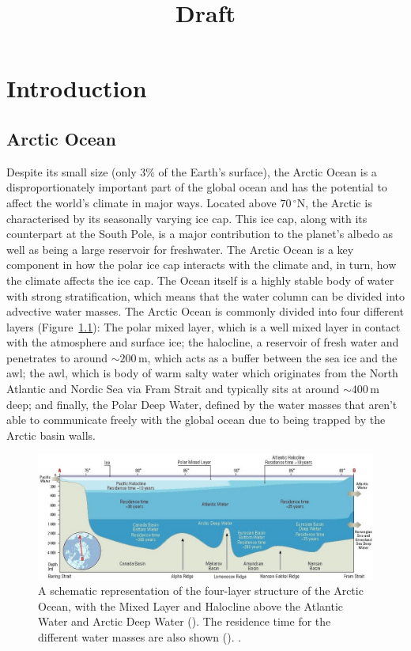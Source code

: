 \documentclass[12pt,a4paper]{report}
\title{Draft}
\newcommand*\figref[1]{Figure~\ref{#1}}
\begin{document}
\maketitle


\chapter{Introduction}
\label{intro}

\glsresetall

\section{Arctic Ocean}
\label{arcticocean}


Despite its small size (only $3\%$ of the Earth's surface), the Arctic
Ocean is a disproportionately important part of the global ocean and has the potential
to affect the world's climate in major ways. Located above
$70\,^{\circ}\mathrm{N}$, the Arctic is characterised by its seasonally
varying ice cap. This ice cap, along with its counterpart at the South
Pole, is a major contribution to the planet's albedo as well as being
a large reservoir for freshwater. The Arctic Ocean is a key component
in how the polar ice cap interacts with the climate and, in turn, how
the climate affects the ice cap. 
The Ocean itself is a highly stable body of water with strong stratification, 
which means that the water column can be divided into advective water masses.
The Arctic Ocean is commonly divided into four different layers (\figref{fig:amap}):
The polar mixed layer, which is a well mixed layer in
contact with the atmosphere and surface ice; the halocline, a
reservoir of fresh water and penetrates to around ${\sim}200\,\mathrm{m}$, which acts
as a buffer between the sea ice and the \gls{awl}; the \gls{awl},
which is body of warm salty water which originates from the North Atlantic and Nordic 
Sea via Fram Strait and typically sits at around ${\sim}400\,\mathrm{m}$ deep; and finally, 
the Polar Deep Water, defined by the water masses that aren't
able to communicate freely with the global ocean due to being trapped by the Arctic basin walls.



\begin{figure}
	\centering
	\includegraphics[width=\linewidth]{amap}
	\caption[\cite{wilson1998amap}]{  A schematic representation of the four-layer structure of the Arctic Ocean, with the Mixed Layer and Halocline
		above the Atlantic Water and Arctic Deep Water (\cite{aagaard1989role}). 
		The residence time for the different water masses are also shown (\cite{bonisch1995deep}). \cite{wilson1998amap}.}
	\label{fig:amap}
\end{figure}
\end{document}

